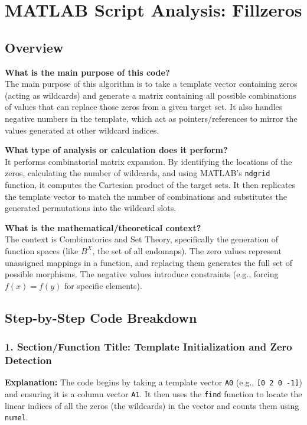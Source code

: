 \chapter{MATLAB Script Analysis: Fillzeros}
\section{Overview}

\textbf{What is the main purpose of this code?} \\
The main purpose of this algorithm is to take a template vector containing zeros (acting as wildcards) and generate a matrix containing all possible combinations of values that can replace those zeros from a given target set. It also handles negative numbers in the template, which act as pointers/references to mirror the values generated at other wildcard indices.

\textbf{What type of analysis or calculation does it perform?} \\
It performs combinatorial matrix expansion. By identifying the locations of the zeros, calculating the number of wildcards, and using MATLAB's \texttt{ndgrid} function, it computes the Cartesian product of the target sets. It then replicates the template vector to match the number of combinations and substitutes the generated permutations into the wildcard slots. 

\textbf{What is the mathematical/theoretical context?} \\
The context is Combinatorics and Set Theory, specifically the generation of function spaces (like $B^X$, the set of all endomaps). The zero values represent unassigned mappings in a function, and replacing them generates the full set of possible morphisms. The negative values introduce constraints (e.g., forcing $f(x) = f(y)$ for specific elements).

\newpage
\section{Step-by-Step Code Breakdown}

\subsection{1. Section/Function Title: Template Initialization and Zero Detection}
\textbf{Explanation:} 
The code begins by taking a template vector \texttt{A0} (e.g., \texttt{[0 2 0 -1]}) and ensuring it is a column vector \texttt{A1}. It then uses the \texttt{find} function to locate the linear indices of all the zeros (the wildcards) in the vector and counts them using \texttt{numel}.

